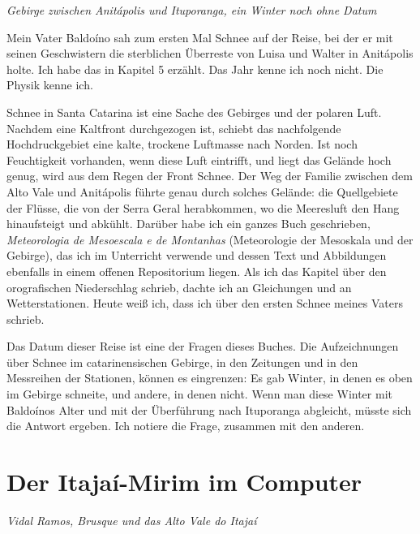 \documentclass[
  ngerman,
  11pt,
  openany]{book}
\begin{document}
\emph{Gebirge zwischen Anitápolis und Ituporanga, ein Winter noch ohne
Datum}

Mein Vater Baldoíno sah zum ersten Mal Schnee auf der Reise, bei der er
mit seinen Geschwistern die sterblichen Überreste von Luisa und Walter
in Anitápolis holte. Ich habe das in Kapitel 5 erzählt. Das Jahr kenne
ich noch nicht. Die Physik kenne ich.

Schnee in Santa Catarina ist eine Sache des Gebirges und der polaren
Luft. Nachdem eine Kaltfront durchgezogen ist, schiebt das nachfolgende
Hochdruckgebiet eine kalte, trockene Luftmasse nach Norden. Ist noch
Feuchtigkeit vorhanden, wenn diese Luft eintrifft, und liegt das Gelände
hoch genug, wird aus dem Regen der Front Schnee. Der Weg der Familie
zwischen dem Alto Vale und Anitápolis führte genau durch solches
Gelände: die Quellgebiete der Flüsse, die von der Serra Geral
herabkommen, wo die Meeresluft den Hang hinaufsteigt und abkühlt.
Darüber habe ich ein ganzes Buch geschrieben, \emph{Meteorologia de
Mesoescala e de Montanhas} (Meteorologie der Mesoskala und der Gebirge),
das ich im Unterricht verwende und dessen Text und Abbildungen ebenfalls
in einem offenen Repositorium liegen. Als ich das Kapitel über den
orografischen Niederschlag schrieb, dachte ich an Gleichungen und an
Wetterstationen. Heute weiß ich, dass ich über den ersten Schnee meines
Vaters schrieb.

Das Datum dieser Reise ist eine der Fragen dieses Buches. Die
Aufzeichnungen über Schnee im catarinensischen Gebirge, in den Zeitungen
und in den Messreihen der Stationen, können es eingrenzen: Es gab
Winter, in denen es oben im Gebirge schneite, und andere, in denen
nicht. Wenn man diese Winter mit Baldoínos Alter und mit der Überführung
nach Ituporanga abgleicht, müsste sich die Antwort ergeben. Ich notiere
die Frage, zusammen mit den anderen.

\section{Der Itajaí-Mirim im
Computer}\label{der-itajauxed-mirim-im-computer}

\emph{Vidal Ramos, Brusque und das Alto Vale do Itajaí}
\end{document}
